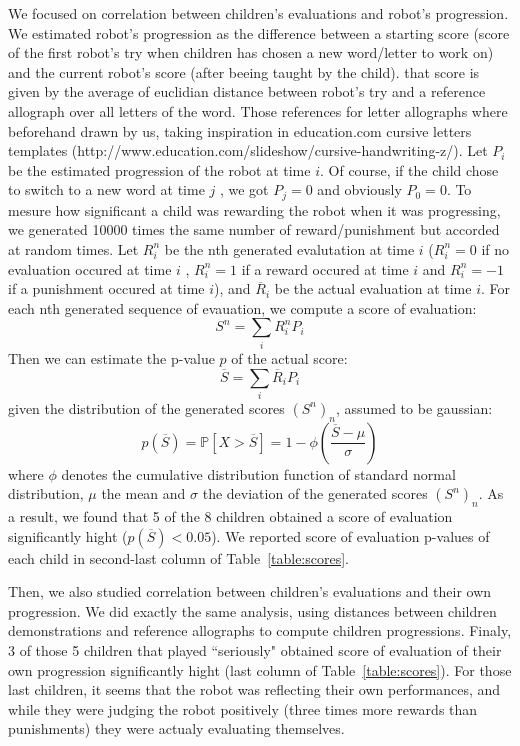\documentclass{sig-alternate}
\begin{document}
We focused on correlation between children's evaluations and robot's progression.
We estimated robot's progression as the difference between a starting score
(score of the first robot's try when children has chosen a new word/letter to
work on) and the current robot's score (after beeing taught by the child). that
score is given by the average of euclidian
distance between robot's try and a reference allograph over all letters of the
word. Those references for letter allographs where beforehand drawn by
us, taking inspiration in education.com cursive letters templates
(http://www.education.com/slideshow/cursive-handwriting-z/). Let $P_i$ be the
estimated progression of the robot at time $ i$. Of course, if the child
chose to switch to a new word at time $ j$ , we got $ P_{j}=0$ and obviously $
P_0=0$.
To mesure how significant a child was rewarding the robot when it was
progressing, we generated 10000 times the same number of reward/punishment
but accorded at random times. Let $ R_i^n$ be the nth generated evalutation at
time $ i$ ($ R_i^n = 0$ if
no evaluation occured at time $ i$ , $ R_i^n=1$ if a reward occured at time
$i$ and $R_i^n=-1$ if a punishment occured at time $i$), and $\overline{R}_i$ be the
actual evaluation at time $i$. For each nth generated sequence of evauation, we
compute a score of evaluation: $$ S^n = \sum\limits_i{R_i^n P_i}$$ 
Then we can estimate the p-value $p$ of the actual score: $$ \overline{S} =
\sum\limits_i{\overline{R}_i P_i}$$ 
given the distribution of the generated scores $\left(S^n\right)_n$, assumed to
be gaussian: 
$$p(\overline{S})= \mathbb{P}{\left[X>\overline{S}\right]} = 1-\phi{\left(\frac{\overline{S}-\mu}{\sigma}\right)}$$
where $\phi$ denotes the cumulative distribution function of standard normal
distribution, $\mu$ the mean and $\sigma$ the deviation of the generated 
scores $\left(S^n\right)_n$. 
As a result, we found that 5 of the 8 children obtained a score of evaluation
significantly hight ($p(\overline{S})<0.05$). We reported score of evaluation
p-values of each child in second-last column of Table~\ref{table:scores}.

Then, we also studied correlation between children's evaluations and their own
progression. We did exactly the same analysis, using distances between children
demonstrations and reference allographs to compute children progressions.
Finaly, 3 of those 5 children that played ``seriously" obtained score of evaluation of their own
progression significantly hight (last column of Table~\ref{table:scores}). For
those last children, it seems that the robot was reflecting their own performances, and while they
were judging the robot positively (three times more rewards than punishments)
they were actualy evaluating themselves.
\end{document}
